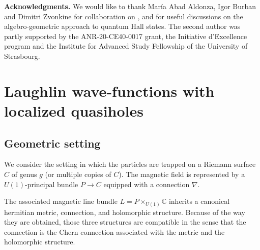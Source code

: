 \documentclass{article}
\theoremstyle{definition}
\begin{document}
{\bf Acknowledgments.} We would like to thank Mar\'ia Abad Aldonza, Igor Burban and Dimitri Zvonkine for collaboration on \cite{Aldonza_Dupont_2025,Klevtsov_Zvonkine_2022,Klevtsov_Zvonkine_2025,Burban_Klevtsov_2025,burban2024norms}, and for useful discussions on the  algebro-geometric  approach to quantum Hall states. The second author was partly supported by the ANR-20-CE40-0017 grant, the Initiative d’Excellence program and the Institute for Advanced Study Fellowship of the University of Strasbourg.

\section{Laughlin wave-functions with localized quasiholes}
\label{sec:Laughlin}

\subsection{Geometric setting}

We consider the setting in which the particles are trapped on a Riemann surface $C$ of genus $g$ (or multiple copies of $C$). The magnetic field is represented by a $U(1)$-principal bundle $P\to C$ equipped with a connection $\nabla$.

\begin{proposition}
The associated magnetic line bundle $L=P\times_{U(1)} \mathbb{C}$ inherits a canonical hermitian metric, connection, and holomorphic structure. Because of the way they are obtained, those three structures are compatible in the sense that the connection is the Chern connection associated with the metric and the holomorphic structure.


\end{proposition}
\end{document}
